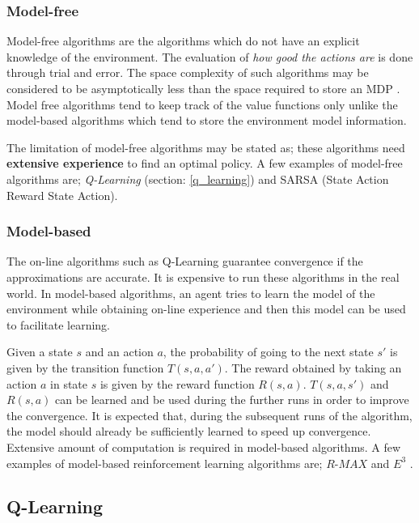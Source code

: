 \documentclass[12pt]{report}
\begin{document}
\subsubsection{Model-free}
Model-free algorithms are the algorithms which do not have an explicit knowledge of the environment. The evaluation of \textit{how good the actions are} is done through trial and error. The space complexity of such algorithms may be considered to be asymptotically less than the space required to store an MDP \cite{strehl2006pac}. Model free algorithms tend to keep track of the value functions only unlike the model-based algorithms which tend to store the environment model information.\par The limitation of model-free algorithms may be stated as; these algorithms need \textbf{extensive experience} to find an optimal policy. A few examples of model-free algorithms are; \textit{Q-Learning} (section: \ref{q_learning}) and SARSA (State Action Reward State Action).

\subsubsection{Model-based}
The on-line algorithms such as Q-Learning guarantee convergence if the approximations are accurate. It is expensive to run these algorithms in the real world. In model-based algorithms, an agent tries to learn the model of the environment while obtaining on-line experience and then this model can be used to facilitate learning. \par 
Given a state $s$ and an action $a$, the probability of going to the next state $s'$ is given by the transition function $T(s,a,a')$. The reward obtained by taking an action $a$ in state $s$ is given by the reward function $R(s,a)$. $T(s,a,s')$ and $R(s,a)$ can be learned and be used during the further runs in order to improve the convergence. It is expected that, during the subsequent runs of the algorithm, the model should already be sufficiently learned to speed up convergence. Extensive amount of computation is required in model-based algorithms. A few examples of model-based reinforcement learning algorithms are;  $R$-$MAX$ \cite{brafman2002r} and $E^3$ \cite{kearns2002near}.

\subsection{Q-Learning}
\label{q_learning_section}
\end{document}
